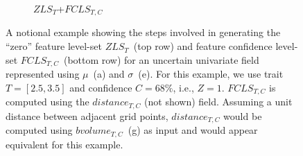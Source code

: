 \begin{figure}[!b]
\begin{subfigure}{0.243\linewidth}
\vspace{-5mm}
\caption{{\scriptsize $ZLS_{T}$+$FCLS_{T,C}$}}
\label{fig:fclsTC}
\end{subfigure}
\caption{A notional example showing the steps involved in generating the ``zero'' feature level-set $ZLS_{T}$~(top row) and feature confidence level-set $FCLS_{T,C}$~(bottom row) for an uncertain univariate field represented using ${\mu}$~(a) and ${\sigma}$~(e).
%
For this example, we use trait $T=[2.5, 3.5]$ and confidence $C=68\%$, i.e., $Z=1$.
%
$FCLS_{T,C}$ is computed using the $distance_{T,C}$ (not shown) field.
%
Assuming a unit distance between adjacent grid points,
%
$distance_{T,C}$ would be computed using $bvolume_{T,C}$~(g) as input and would appear equivalent for this example.
}
\label{fig:example}
\vspace{-5mm}
\end{figure}
